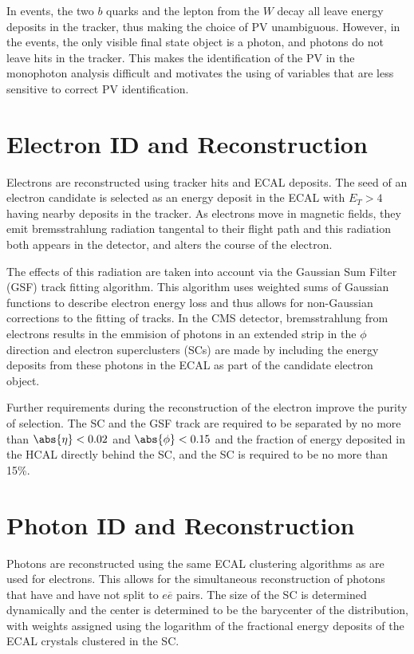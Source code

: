  In \ppwbblnbb events, the two $b$ quarks and
  the lepton from the $W$ decay all leave energy
  deposits in the tracker, thus making the choice
  of PV unambiguous.
 However, in the \pploneg events,
  the only visible final state object is a photon,
  and photons do not leave hits in the tracker.
 This makes the identification of the PV
  in the monophoton analysis difficult
  and motivates the using of variables that
  are less sensitive to correct PV identification.
  
\section{Electron ID and Reconstruction}

 Electrons are reconstructed using tracker
  hits and ECAL deposits.
 The seed of an electron candidate is selected as 
  an energy deposit in the ECAL with $E_T > 4$ \GeV
  having nearby deposits in the tracker.
 As electrons move in magnetic fields,
  they emit bremsstrahlung radiation
  tangental to their flight path
  and this radiation both appears in the detector, 
  and alters the course of the electron.

 The effects of this radiation are taken
  into account via the Gaussian Sum Filter (GSF)
  track fitting algorithm.
 This algorithm uses weighted sums of Gaussian
  functions to describe electron energy loss
  and thus allows for non-Gaussian corrections
  to the fitting of tracks.
 In the CMS detector, 
  bremsstrahlung from electrons results in the
  emmision of photons in an extended strip
  in the $\phi$ direction and electron
  superclusters (SCs) are made by 
  including the energy deposits from 
  these photons in the ECAL as part of the
  candidate electron object.

 Further requirements during the reconstruction of
  the electron improve the purity of selection.
 The SC and the GSF track are required to 
  be separated by no more than $\abs{\eta}<0.02$
  and $\abs{\phi}<0.15$ and the fraction of
  energy deposited in the HCAL directly behind
  the SC, and the SC is required to be no more
  than 15\%.
 

\section{Photon ID and Reconstruction}

 Photons are reconstructed using the same ECAL
  clustering algorithms as are used for electrons.
 This allows for
  the simultaneous reconstruction of
  photons that have and have not split to $e\overline{e}$
  pairs.
 The size of the SC is determined dynamically
  and the center is determined to be the barycenter
  of the distribution, with weights assigned
  using the logarithm of the fractional energy deposits
  of the ECAL crystals clustered in the SC.

